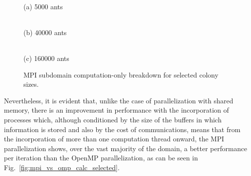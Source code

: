 \begin{figure}[!htbp]
\centering
\begin{minipage}{0.48\columnwidth}
    \centering
    \\[-2mm]
    {\footnotesize (a) 5000 ants}
\end{minipage}
\hfill
\begin{minipage}{0.48\columnwidth}
    \centering
    \\[-2mm]
    {\footnotesize (b) 40000 ants}
\end{minipage}

\vspace{1mm}
\begin{minipage}{0.62\columnwidth}
    \centering
    \\[-2mm]
    {\footnotesize (c) 160000 ants}
\end{minipage}
\caption{MPI subdomain computation-only breakdown for selected colony sizes.}
\label{fig:mpi_calc_only_selected}
\end{figure}

Nevertheless, it is evident that, unlike the case of parallelization with shared memory, there is an improvement in performance with the incorporation of processes which, although conditioned by the size of the buffers in which information is stored and also by the cost of communications, means that from the incorporation of more than one computation thread onward, the MPI parallelization shows, over the vast majority of the domain, a better performance per iteration than the OpenMP parallelization, as can be seen in Fig.~\ref{fig:mpi_vs_omp_calc_selected}.



